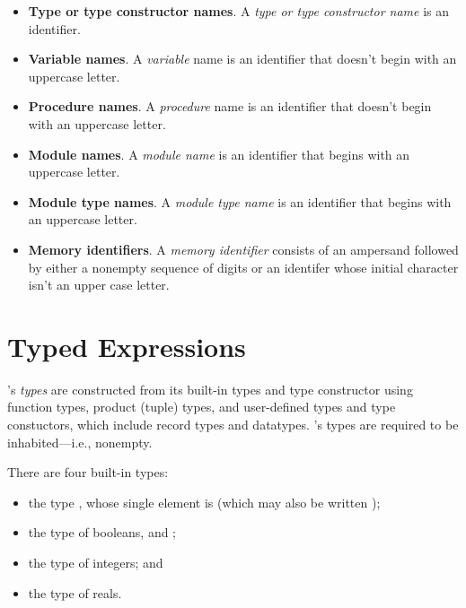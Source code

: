 \begin{itemize}
\item \textbf{Type or type constructor names}. A \emph{type or type
  constructor name} is an identifier.

\item \textbf{Variable names}. A \emph{variable} name is an identifier
  that doesn't begin with an uppercase letter.

\item \textbf{Procedure names}. A \emph{procedure} name is an identifier
  that doesn't begin with an uppercase letter.

\item \textbf{Module names}. A \emph{module name} is an identifier that
  begins with an uppercase letter.

\item \textbf{Module type names}. A \emph{module type name} is an
  identifier that begins with an uppercase letter.

\item \textbf{Memory identifiers}. A \emph{memory identifier} consists
of an ampersand followed by either a nonempty sequence of digits or
an identifer whose initial character isn't an upper case letter.

\end{itemize}

\section{Typed Expressions}

\EasyCrypt's \emph{types} are constructed from its built-in types and
type constructor using function types, product (tuple) types, and
user-defined types and type constuctors, which include record types
and datatypes. \EasyCrypt's types are required to be inhabited---i.e.,
nonempty.

There are four built-in types:
\begin{itemize}
\item the type , whose single element is  (which may
  also be written \ec{()});

\item the type  of booleans,  and ;

\item the type  of integers; and

\item the type  of reals.
\end{itemize}

